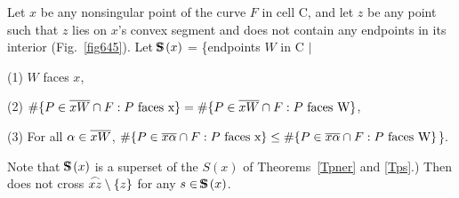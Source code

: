 \begin{lemma}
\label{lem-645}
Let $x$ be any nonsingular point of the curve $F$ in cell C,
and let $z$ be any point such that $z$ lies on $x$'s convex segment
and  does not contain any endpoints in its interior 
{\rm (}Fig.~{\rm \ref{fig645})}.
Let $\mbox{S\hspace{-0.68em}S\hspace{.25em}}(x)$ = \{endpoints $W$ in C $\mid$

{\rm (1)} $W$ faces $x$,

{\rm (2)} \mbox{$\#\{P \in\mbox{$\overline{xW}$}\cap F: P \mbox{ faces x}\} =
\#\{P \in \mbox{$\overline{xW}$}\cap F: P \mbox{ faces W} \}$},

{\rm (3)} For all $\alpha \in \mbox{$\overline{xW}$}$,
$\#\{P \in\mbox{$\overline{x\alpha}$}\cap F: P \mbox{ faces x}\} \leq
\#\{P \in \mbox{$\overline{x\alpha}$}\cap F: P \mbox{ faces W}\} $\}.

\vspace{.05in}

\noindent {\rm (}Note that 
$\mbox{S\hspace{-0.68em}S\hspace{.25em}}(x)$ is a superset of the $S(x)$ of Theorems~{\rm \ref{Tpner}} and {\rm \ref{Tps}.)}
Then  does not cross $\mbox{$\stackrel{\frown}{xz}$} \setminus \{z\}$ 
for any $s \in \mbox{S\hspace{-0.68em}S\hspace{.25em}}(x)$.
\end{lemma}
%
%
